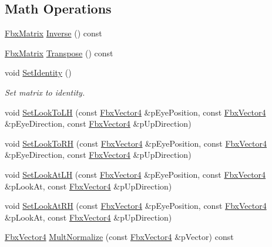\subsection*{Math Operations}
\begin{DoxyCompactItemize}
\item 
\hyperlink{class_fbx_matrix}{Fbx\+Matrix} \hyperlink{class_fbx_matrix_ad08366052eb8d9df5f453c7b6045d433}{Inverse} () const
\item 
\hyperlink{class_fbx_matrix}{Fbx\+Matrix} \hyperlink{class_fbx_matrix_ad71dfeec606708fa105cc4fec4b92027}{Transpose} () const
\item 
void \hyperlink{class_fbx_matrix_aa9ae7a84a1c18119a7259a5e904c2103}{Set\+Identity} ()
\begin{DoxyCompactList}\small\item\em Set matrix to identity. \end{DoxyCompactList}\item 
void \hyperlink{class_fbx_matrix_a12d8f9a36c338d81a9807029adaf8af7}{Set\+Look\+To\+LH} (const \hyperlink{class_fbx_vector4}{Fbx\+Vector4} \&p\+Eye\+Position, const \hyperlink{class_fbx_vector4}{Fbx\+Vector4} \&p\+Eye\+Direction, const \hyperlink{class_fbx_vector4}{Fbx\+Vector4} \&p\+Up\+Direction)
\item 
void \hyperlink{class_fbx_matrix_ac5615b560c64d77ced2e0848e5414b09}{Set\+Look\+To\+RH} (const \hyperlink{class_fbx_vector4}{Fbx\+Vector4} \&p\+Eye\+Position, const \hyperlink{class_fbx_vector4}{Fbx\+Vector4} \&p\+Eye\+Direction, const \hyperlink{class_fbx_vector4}{Fbx\+Vector4} \&p\+Up\+Direction)
\item 
void \hyperlink{class_fbx_matrix_a4fc44b7575600ae53d954a9732fc6d56}{Set\+Look\+At\+LH} (const \hyperlink{class_fbx_vector4}{Fbx\+Vector4} \&p\+Eye\+Position, const \hyperlink{class_fbx_vector4}{Fbx\+Vector4} \&p\+Look\+At, const \hyperlink{class_fbx_vector4}{Fbx\+Vector4} \&p\+Up\+Direction)
\item 
void \hyperlink{class_fbx_matrix_a9c7d26723434b5bbe31fdac94d4eb820}{Set\+Look\+At\+RH} (const \hyperlink{class_fbx_vector4}{Fbx\+Vector4} \&p\+Eye\+Position, const \hyperlink{class_fbx_vector4}{Fbx\+Vector4} \&p\+Look\+At, const \hyperlink{class_fbx_vector4}{Fbx\+Vector4} \&p\+Up\+Direction)
\item 
\hyperlink{class_fbx_vector4}{Fbx\+Vector4} \hyperlink{class_fbx_matrix_a6c0d007cd876405973411e185aabe8a9}{Mult\+Normalize} (const \hyperlink{class_fbx_vector4}{Fbx\+Vector4} \&p\+Vector) const
\end{DoxyCompactItemize}

